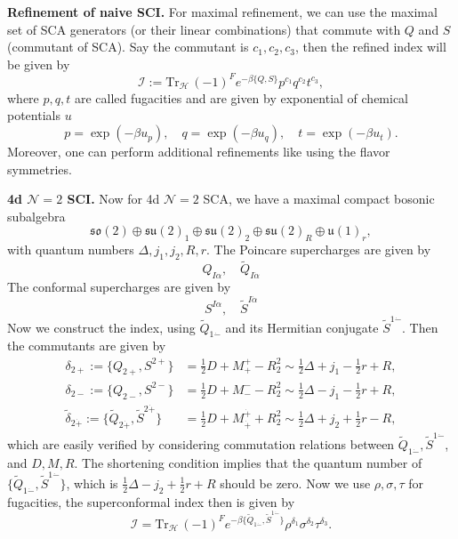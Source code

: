 \documentclass[a4paper,11pt]{article}
\begin{document}
\bigskip
\noindent\textbf{Refinement of naive SCI.}
For maximal refinement, we can use the maximal set of SCA generators (or their linear combinations) that commute with $Q$ and $S$ (commutant of SCA). Say the commutant is $c_1, c_2, c_3$, then the refined index will be given by
$$
\mathcal{I}:= \mathrm{Tr}_\mathcal{H}\,(-1)^F e^{-\beta \{Q,S\}} p^{c_1} q^{c_2} t^{c_3},
$$
where $p, q, t$ are called fugacities and are given by exponential of chemical potentials $u$
$$
p = \exp(- \beta u_p), \quad q = \exp(-\beta u_q), \quad t = \exp(-\beta u_t).
$$
Moreover, one can perform additional refinements like using the flavor symmetries.

\bigskip
\noindent\textbf{4d $\mathcal{N}=2$ SCI.}
Now for 4d $\mathcal{N}=2$ SCA, we have a maximal compact bosonic subalgebra
$$
\mathfrak{so}(2) \oplus \mathfrak{su}(2)_1 \oplus \mathfrak{su}(2)_2 \oplus \mathfrak{su}(2)_R \oplus \mathfrak{u}(1)_r,
$$
with quantum numbers $\Delta, j_1, j_2, R, r$. The Poincare supercharges are given by
$$
Q_{I \alpha}, \quad \widetilde{Q}_{I\dot{\alpha}}
$$
The conformal supercharges are given by
$$
S^{I\alpha}, \quad \widetilde{S}^{I \dot{\alpha}}
$$
Now we construct the index, using $\widetilde{Q}_{1\dot{-}}$ and its Hermitian conjugate $\widetilde{S}^{1\dot{-}}$. Then the commutants are given by
\begin{equation}
\begin{aligned}
    \delta_{2+} :=\{Q_{2+}, S^{2+}\} &= \frac{1}{2} D + M_+^+ - R_2^2 \sim \frac{1}{2} \Delta + j_1 - \frac{1}{2}r + R,\\
    \delta_{2-}:=\{Q_{2-}, S^{2-}\} &= \frac{1}{2} D + M_-^- - R^2_2 \sim \frac{1}{2} \Delta - j_1 - \frac{1}{2}r + R,\\
    \tilde{\delta}_{2\dot{+}}:=\{\widetilde{Q}_{2\dot{+}}, \widetilde{S}^{2\dot{+}}\} &= \frac{1}{2} D + M_{\dot{+}}^{\dot{+}} + R^2_2 \sim \frac{1}{2} \Delta + j_2 + \frac{1}{2}r - R,
\end{aligned}
\end{equation}
which are easily verified by considering commutation relations between $\widetilde{Q}_{1\dot{-}}, \widetilde{S}^{1\dot{-}}$, and $D, M, R$.
The shortening condition implies that the quantum number of $\{\widetilde{Q}_{1\dot{-}}, \widetilde{S}^{1\dot{-}}\}$, which is $\frac{1}{2}\Delta - j_2 +\frac{1}{2}r + R$ should be zero. Now we use $\rho, \sigma, \tau$ for fugacities, the superconformal index then is given by
\begin{equation}
    \mathcal{I} = \mathrm{Tr}_\mathcal{H}\, (-1)^F e^{-\beta \{\widetilde{Q}_{1\dot{-}}, \widetilde{S}^{1\dot{-}} \} } \rho^{\delta_1} \sigma^{\delta_2} \tau^{\delta_3}.
\end{equation}
\end{document}
